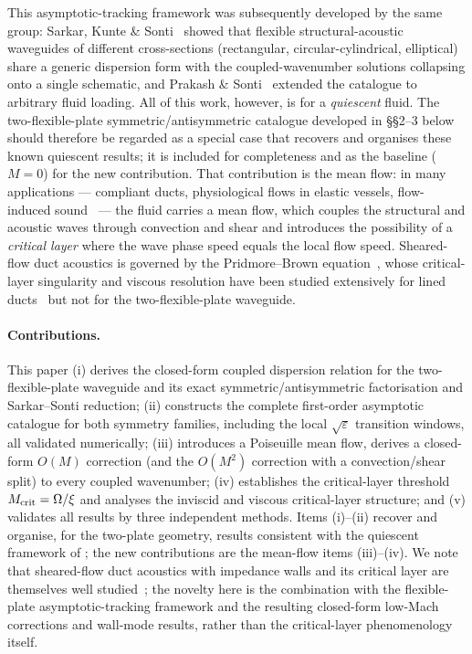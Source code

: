 \documentclass[11pt]{article}
\newcommand{\Om}{\Omega}
\newcommand{\eps}{\varepsilon}
\begin{document}
This asymptotic-tracking framework was subsequently developed by the same group: Sarkar, Kunte \&
Sonti~\cite{kunte2011} showed that flexible structural-acoustic waveguides of different cross-sections
(rectangular, circular-cylindrical, elliptical) share a generic dispersion form with the
coupled-wavenumber solutions collapsing onto a single schematic, and Prakash \& Sonti~\cite{prakash2016}
extended the catalogue to arbitrary fluid loading. All of this work, however, is for a \emph{quiescent}
fluid. The two-flexible-plate symmetric/antisymmetric catalogue developed in \S\S2--3 below should
therefore be regarded as a special case that recovers and organises these known quiescent results; it
is included for completeness and as the baseline ($M=0$) for the new contribution. That contribution is
the mean flow: in many applications --- compliant ducts, physiological flows in elastic vessels,
flow-induced sound~\cite{morab} --- the fluid carries a mean flow, which couples the structural and
acoustic waves through convection and shear and introduces the possibility of a \emph{critical layer}
where the wave phase speed equals the local flow speed.
Sheared-flow duct acoustics is governed by the Pridmore--Brown equation~\cite{pridmorebrown}, whose
critical-layer singularity and viscous resolution have been studied extensively for lined
ducts~\cite{brambley,brambleydarau,maslowe} but not for the two-flexible-plate waveguide.

\paragraph{Contributions.} This paper (i) derives the closed-form coupled dispersion relation for the
two-flexible-plate waveguide and its exact symmetric/antisymmetric factorisation and Sarkar--Sonti
reduction; (ii) constructs the complete first-order asymptotic catalogue for both symmetry families,
including the local $\sqrt{\eps}$ transition windows, all validated numerically; (iii) introduces a
Poiseuille mean flow, derives a closed-form $O(M)$ correction (and the $O(M^2)$ correction with a
convection/shear split) to every coupled wavenumber; (iv) establishes the critical-layer threshold
$M_{\rm crit}=\Om/\xi$ and analyses the inviscid and viscous critical-layer structure; and (v)
validates all results by three independent methods. Items (i)--(ii) recover and organise, for the
two-plate geometry, results consistent with the quiescent framework of
\cite{sarkarsonti,kunte2011,prakash2016}; the new contributions are the mean-flow items (iii)--(iv).
We note that sheared-flow duct acoustics with impedance walls and its critical layer are themselves
well studied~\cite{pridmorebrown,brambleydarau,maslowe}; the novelty here is the combination with the
flexible-plate asymptotic-tracking framework and the resulting closed-form low-Mach corrections and
wall-mode results, rather than the critical-layer phenomenology itself.
\end{document}
